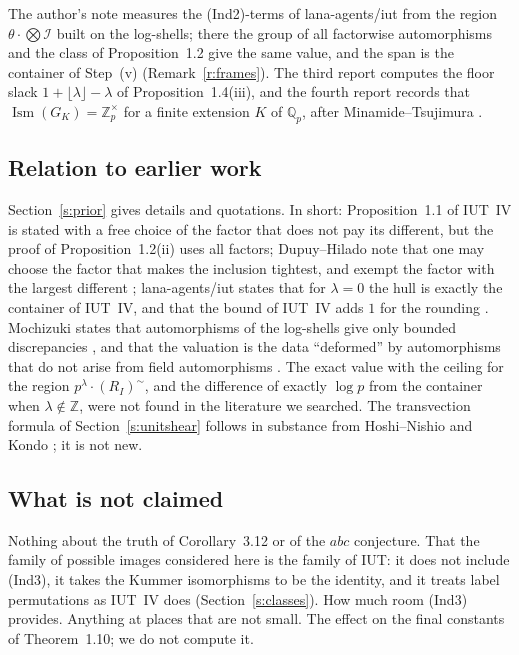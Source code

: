 \documentclass[11pt,a4paper]{article}
\newcommand{\Z}{\mathbb{Z}}
\newcommand{\Zp}{\mathbb{Z}_p}
\newcommand{\Qp}{\mathbb{Q}_p}
\newcommand{\I}{\mathcal{I}}
\newcommand{\tI}{(R_I)^{\sim}}
\newcommand{\Ism}{\operatorname{Ism}}
\newcommand{\floor}[1]{\lfloor #1\rfloor}
\theoremstyle{plain}
\theoremstyle{definition}
\theoremstyle{remark}
\begin{document}
The author's note \cite{Gap} measures the (Ind2)-terms of lana-agents/iut from the region $\theta\cdot\bigotimes\I$
built on the log-shells; there the group of all factorwise automorphisms and the class of Proposition~1.2 give the
same value, and the span is the container of Step~(v) (Remark~\ref{r:frames}). The third report \cite{Third}
computes the floor slack $1+\floor{\lambda}-\lambda$ of Proposition~1.4(iii), and the fourth report \cite{Fourth}
records that $\Ism(G_K)=\Zp^{\times}$ for a finite extension $K$ of $\Qp$, after Minamide--Tsujimura \cite{MT}.

\subsection{Relation to earlier work}
Section~\ref{s:prior} gives details and quotations. In short: Proposition~1.1 of IUT~IV is stated with a free choice
of the factor that does not pay its different, but the proof of Proposition~1.2(ii) uses all factors; Dupuy--Hilado
note that one may choose the factor that makes the inclusion tightest, and exempt the factor with the largest different
\cite[Rem.~2.8.2, (6.4)]{DHPS}; lana-agents/iut states that for $\lambda=0$ the hull is exactly the container of
IUT~IV, and that the bound of IUT~IV adds $1$ for the rounding \cite{lana}. Mochizuki states that automorphisms of the
log-shells give only bounded discrepancies \cite[Ex.~3.5.1]{EssLgc}, and that the valuation is the data
``deformed'' by automorphisms that do not arise from field automorphisms \cite[\S I3]{AbsTopIII}. The exact value with
the ceiling for the region $p^{\lambda}\cdot\tI$, and the difference of exactly $\log p$ from the container when
$\lambda\notin\Z$, were not found in the literature we searched. The transvection formula of
Section~\ref{s:unitshear} follows in substance from Hoshi--Nishio \cite{HN} and Kondo \cite{Kondo}; it is not new.

\subsection{What is not claimed}
Nothing about the truth of Corollary~3.12 or of the $abc$ conjecture. That the family of possible images considered
here is the family of IUT: it does not include (Ind3), it takes the Kummer isomorphisms to be the identity, and it
treats label permutations as IUT~IV does (Section~\ref{s:classes}). How much room (Ind3) provides. Anything at places
that are not small. The effect on the final constants of Theorem~1.10; we do not compute it.
\end{document}
